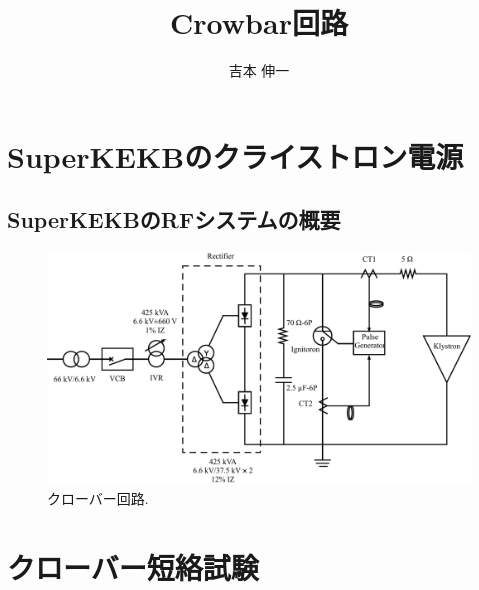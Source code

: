 \documentclass[book,openany]{jlreq}
\theoremstyle{definition}
\begin{document}
\title{Crowbar回路}
\author{吉本 伸一}
\maketitle
\tableofcontents

\chapter{SuperKEKBのクライストロン電源}
\section{SuperKEKBのRFシステムの概要}

%
\begin{figure}[htbp]
  \begin{center}
    \includegraphics[width=12cm]{figs/Crowbar_Circuit.pdf}
    \caption{クローバー回路.}
    \label{fig:CrowbarCircuit}
  \end{center}
\end{figure}

\chapter{クローバー短絡試験}
\end{document}
